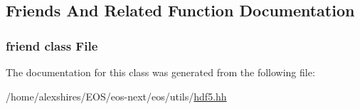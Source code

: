 \subsection{Friends And Related Function Documentation}
\hypertarget{classeos_1_1hdf5_1_1DataSetHandle_a68d15876ad188b7628261b12d0eac8aa}{
\subsubsection[{File}]{\setlength{\rightskip}{0pt plus 5cm}friend class {\bf File}}}
\label{classeos_1_1hdf5_1_1DataSetHandle_a68d15876ad188b7628261b12d0eac8aa}


The documentation for this class was generated from the following file:\begin{DoxyCompactItemize}
\item 
/home/alexshires/EOS/eos-\/next/eos/utils/\hyperlink{hdf5_8hh}{hdf5.hh}\end{DoxyCompactItemize}
